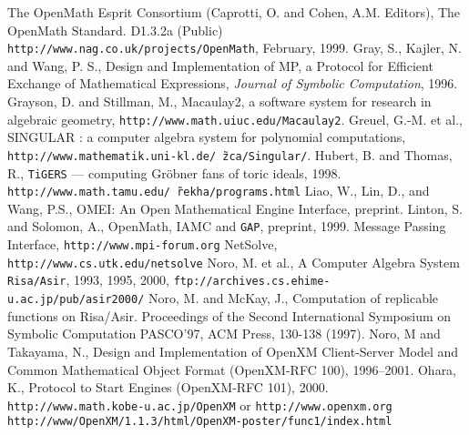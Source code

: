 
\begin{thebibliography}{X}
The OpenMath Esprit Consortium 
(Caprotti, O. and Cohen, A.M. Editors),
The OpenMath Standard. D1.3.2a (Public) \\
{\small {\tt http://www.nag.co.uk/projects/OpenMath}},
February, 1999.
Gray, S., Kajler, N. and Wang, P. S.,
Design and Implementation of MP, a Protocol for Efficient
  Exchange of Mathematical Expressions,
{\sl Journal of Symbolic Computation}, 1996.
Grayson, D. and Stillman, M.,
Macaulay2, a software system for research in algebraic geometry,
 {\small {\tt http://www.math.uiuc.edu/Macaulay2}}.
Greuel, G.-M. et al., SINGULAR : a computer algebra system for polynomial
computations,
{\small {\tt http://www.mathematik.uni-kl.de/\~\,zca/Singular/}}.
Hubert, B. and Thomas, R.,
{\tt TiGERS} --- computing Gr\"obner fans of toric
ideals, 1998.
{\small
{\tt http://www.math.tamu.edu/\~\,rekha/programs.html}}
Liao, W., Lin, D., and Wang, P.S.,
{OMEI: An Open Mathematical Engine Interface},
preprint.
Linton, S. and Solomon, A.,
OpenMath, IAMC and {\tt GAP},
preprint, 1999.
 Message Passing Interface,
{\small {\tt http://www.mpi-forum.org}} 
NetSolve, {\small {\tt http://www.cs.utk.edu/netsolve}}
Noro, M. et al., 
A Computer Algebra System {\tt Risa/Asir},  1993, 1995, 2000,
{\small {\tt ftp://archives.cs.ehime-u.ac.jp/pub/asir2000/}}
Noro, M. and McKay, J.,
Computation of replicable functions on Risa/Asir.
Proceedings of the Second International Symposium on
Symbolic Computation PASCO'97, ACM Press, 130-138 (1997).
Noro, M and Takayama, N., Design and Implementation
of OpenXM Client-Server Model and Common Mathematical Object Format
(OpenXM-RFC 100), 1996--2001.
Ohara, K.,
Protocol to Start Engines (OpenXM-RFC 101),
2000.
{\small {\tt http://www.math.kobe-u.ac.jp/OpenXM}}
or 
{\small {\tt http://www.openxm.org}}
{\small {\tt http://www/OpenXM/1.1.3/html/OpenXM-poster/func1/index.html}}

\end{thebibliography}
